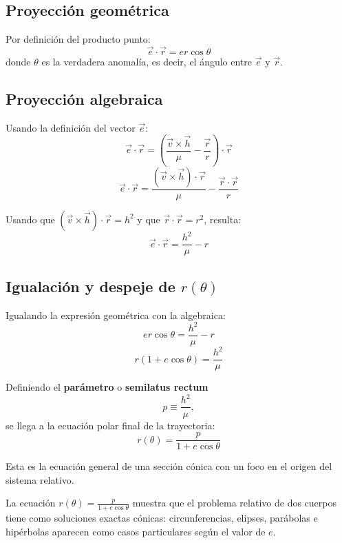 \subsection{Proyección geométrica}
Por definición del producto punto:
\[
\vec{e} \cdot \vec{r} = e r \cos\theta
\]
donde \(\theta\) es la verdadera anomalía, es decir, el ángulo entre \(\vec{e}\) y \(\vec{r}\).

\subsection{Proyección algebraica}
Usando la definición del vector \(\vec{e}\):
\[
\vec{e} \cdot \vec{r} = \left(\frac{\vec{v} \times \vec{h}}{\mu} - \frac{\vec{r}}{r}\right) \cdot \vec{r}
\]
\[
\vec{e} \cdot \vec{r} = \frac{(\vec{v} \times \vec{h}) \cdot \vec{r}}{\mu} - \frac{\vec{r} \cdot \vec{r}}{r}
\]

Usando que \((\vec{v} \times \vec{h}) \cdot \vec{r} = h^2\) y que \(\vec{r} \cdot \vec{r} = r^2\), resulta:
\[
\vec{e} \cdot \vec{r} = \frac{h^2}{\mu} - r
\]

\subsection{Igualación y despeje de \texorpdfstring{$r(\theta)$}{r(theta)}}
Igualando la expresión geométrica con la algebraica:
\[
 e r \cos\theta = \frac{h^2}{\mu} - r
\]
\[
 r(1 + e\cos\theta) = \frac{h^2}{\mu}
\]

Definiendo el \textbf{parámetro} o \textbf{semilatus rectum}
\[
 p \equiv \frac{h^2}{\mu},
\]
se llega a la ecuación polar final de la trayectoria:
\[
\boxed{r(\theta) = \frac{p}{1 + e\cos\theta}}
\]

Esta es la ecuación general de una sección cónica con un foco en el origen del sistema relativo.

\begin{importante}
La ecuación \(r(\theta) = \frac{p}{1 + e\cos\theta}\) muestra que el problema relativo de dos cuerpos tiene como soluciones exactas cónicas: circunferencias, elipses, parábolas e hipérbolas aparecen como casos particulares según el valor de \(e\).
\end{importante}


